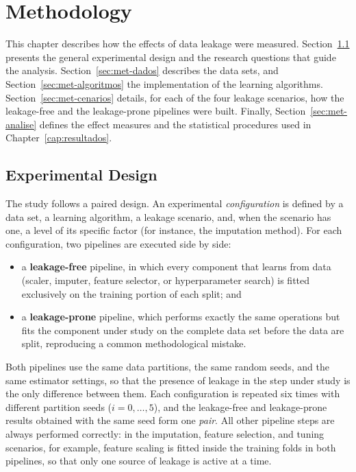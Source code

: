\chapter{Methodology}
\label{cap:metodologia}

This chapter describes how the effects of data leakage were measured.
Section~\ref{sec:met-desenho} presents the general experimental design and the
research questions that guide the analysis. Section~\ref{sec:met-dados}
describes the data sets, and Section~\ref{sec:met-algoritmos} the
implementation of the learning algorithms. Section~\ref{sec:met-cenarios}
details, for each of the four leakage scenarios, how the leakage-free and the
leakage-prone pipelines were built. Finally, Section~\ref{sec:met-analise}
defines the effect measures and the statistical procedures used in
Chapter~\ref{cap:resultados}.

\section{Experimental Design}
\label{sec:met-desenho}

The study follows a paired design. An experimental \emph{configuration} is
defined by a data set, a learning algorithm, a leakage scenario, and, when the
scenario has one, a level of its specific factor (for instance, the imputation
method). For each configuration, two pipelines are executed side by side:

\begin{itemize}
  \item a \textbf{leakage-free} pipeline, in which every component that learns
  from data (scaler, imputer, feature selector, or hyperparameter search) is
  fitted exclusively on the training portion of each split; and
  \item a \textbf{leakage-prone} pipeline, which performs exactly the same
  operations but fits the component under study on the complete data set
  before the data are split, reproducing a common methodological mistake.
\end{itemize}

Both pipelines use the same data partitions, the same random seeds, and the same
estimator settings, so that the presence of leakage in the step under study is
the only difference between them. Each configuration is repeated six times with
different partition seeds ($i = 0, \ldots, 5$), and the leakage-free and
leakage-prone results obtained with the same seed form one \emph{pair}. All
other pipeline steps are always performed correctly: in the imputation, feature
selection, and tuning scenarios, for example, feature scaling is fitted inside
the training folds in both pipelines, so that only one source of leakage is
active at a time.

